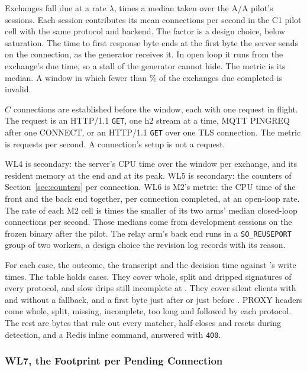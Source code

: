  Exchanges fall due at a rate $\lambda$, \RateFrac{} times a median
taken over the A/A pilot's sessions. Each session contributes its mean connections per second in
the C1 pilot cell with the same protocol and backend. The factor is a design choice, below
saturation. The time to first response byte ends at the first byte the server sends on the
connection, as the generator receives it. In open loop it runs from the exchange's due time, so a
stall of the generator cannot hide. The metric is its median. A window in which fewer than
\OpenDonePct\% of the exchanges due completed is invalid.

 $C$ connections are established before the window, each with one request
in flight. The request is an HTTP/1.1 \texttt{GET}, one h2 stream at a time, MQTT PINGREQ after one
CONNECT, or an HTTP/1.1 \texttt{GET} over one TLS connection. The metric is requests per second. A connection's
setup is not a request.

 WL4 is secondary: the server's CPU time over the window per exchange, and its
resident memory at the end and at its peak. WL5 is secondary: the counters of
Section~\ref{sec:counters} per connection. WL6 is M2's metric: the CPU time of the front and the
back end together, per connection completed, at an open-loop rate. The rate of each M2 cell is
\RateFrac{} times the smaller of its two arms' median closed-loop connections per second. Those
medians come from \RateSessions{} development sessions on the frozen binary after the pilot. The relay
arm's back end runs in a \texttt{SO\_REUSEPORT} group of two workers, a design choice the revision
log records with its reason.

 For each case, the outcome, the transcript and the decision time against
\opcase's write times. The table holds \HardCases{} cases. They cover whole, split and dripped
signatures of every protocol, and slow drips still incomplete at \Tdec. They cover silent clients
with and without a fallback, and a first byte just after or just before \Tfb. PROXY headers come whole, split, missing,
incomplete, too long and followed by each protocol. The rest are bytes that rule out every matcher,
half-closes and resets during detection, and a Redis inline command, answered with \texttt{400}.

\subsubsection{WL7, the Footprint per Pending Connection}\label{sec:footprint}

